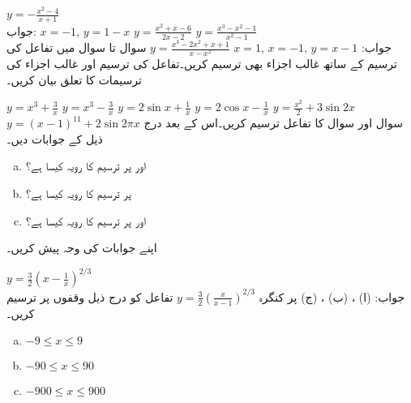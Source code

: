 $y=-\tfrac{x^2-4}{x+1}$\\
جواب:\quad
$x=-1,\, y=1-x$
$y=\tfrac{x^2+x-6}{2x-2}$
$y=\tfrac{x^3-x^2-1}{x^2-1}$\\
جواب:\quad
$x=1,\,x=-1,\,y=x-1$
$y=\tfrac{x^3-2x^2+x+1}{x-x^2}$
سوال  تا سوال  میں تفاعل کی ترسیم کے ساتھ غالب اجزاء بھی ترسیم کریں۔تفاعل کی ترسیم اور غالب اجزاء کی ترسیمات کا تعلق بیان کریں۔

$y=x^3+\tfrac{3}{x}$
$y=x^3-\tfrac{3}{x}$
$y=2\sin x+\tfrac{1}{x}$
$y=2\cos x-\tfrac{1}{x}$
$y=\tfrac{x^2}{2}+3\sin 2x$
$y=(x-1)^{11}+2\sin 2\pi x$
سوال  اور سوال  کا تفاعل ترسیم کریں۔اس کے بعد درج ذیل کے جوابات دیں۔
\begin{enumerate}[a.]
\item
{} اور  پر ترسیم کا رویہ کیسا ہے؟
\item
{} پر ترسیم کا رویہ کیسا ہے؟
\item
{} اور  پر ترسیم کا رویہ کیسا ہے؟
\end{enumerate}
اپنے جوابات کی وجہ پیش کریں۔

$y=\tfrac{3}{2}(x-\tfrac{1}{x})^{2/3}$\\
جواب:\quad
(ا) ، (ب) ، (ج)  پر کنگرہ
$y=\tfrac{3}{2}(\tfrac{x}{x-1})^{2/3}$
تفاعل  کو درج ذیل وقفوں پر ترسیم کریں۔
\begin{multicols}{3}
\begin{enumerate}[a.]
\item
$-9\le x\le 9$
\item
$-90\le x\le 90$
\item
$-900\le x\le 900$
\end{enumerate}
\end{multicols}

